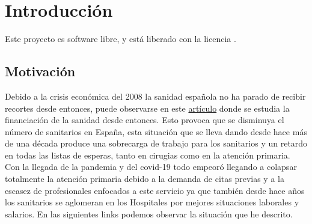 \chapter{Introducción}

Este proyecto es software libre, y está liberado con la licencia \cite{gplv3}.

\section{Motivación}
Debido a la crisis económica del 2008 la sanidad española no ha parado de recibir recortes desde entonces, puede observarse en este
\href{https://www.consalud.es/politica/decada-recortes-2009-2018-efectos-infrafinanciacion-sanidad_87083_102.html}{artículo} donde
se estudia la financiación de la sanidad desde entonces. Esto provoca que se disminuya el número de sanitarios en España, 
esta situación que se lleva dando desde hace más de una década produce una sobrecarga de trabajo para los sanitarios y un retardo 
en todas las listas de esperas, tanto en cirugias como en la atención primaria. 
Con la llegada de la pandemia y del covid-19 todo empeoró llegando a colapsar totalmente la atención primaria debido a la demanda
de citas previas y a la escasez de profesionales enfocados a este servicio ya que también desde hace años los sanitarios se aglomeran
en los Hospitales por mejores situaciones laborales y salarios. En las siguientes links podemos observar la situación que he descrito.
